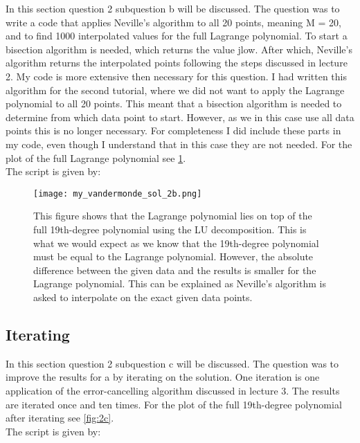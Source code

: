 In this section question 2 subquestion b will be discussed. The question was to write a code that applies Neville's algorithm to all 20 points, meaning M = 20, and to find 1000 interpolated values for the full Lagrange polynomial. To start a bisection algorithm is needed, which returns the value jlow. After which, Neville's algorithm returns the interpolated points following the steps discussed in lecture 2. My code is more extensive then necessary for this question. I had written this algorithm for the second tutorial, where we did not want to apply the Lagrange polynomial to all 20 points. This meant that a bisection algorithm is needed to determine from which data point to start. However, as we in this case use all data points this is no longer necessary. For completeness I did include these parts in my code, even though I understand that in this case they are not needed. For the plot of the full Lagrange polynomial see \ref{fig:2b}.\\ 

The script is given by:


\begin{figure}[h!]
  \centering
  \texttt{[image: my\_vandermonde\_sol\_2b.png]}
  \caption{This figure shows that the Lagrange polynomial lies on top of the full 19th-degree polynomial using the LU decomposition. This is what we would expect as we know that the 19th-degree polynomial must be equal to the Lagrange polynomial. However, the absolute difference between the given data and the results is smaller for the Lagrange polynomial. This can be explained as Neville's algorithm is asked to interpolate on the exact given data points.}
  \label{fig:2b}
\end{figure}

\subsection{Iterating}

In this section question 2 subquestion c will be discussed. The question was to improve the results for a by iterating on the solution. One iteration is one application of the error-cancelling algorithm discussed in lecture 3. The results are iterated once and ten times. For the plot of the full 19th-degree polynomial after iterating see \ref{fig:2c}. \\

The script is given by:


